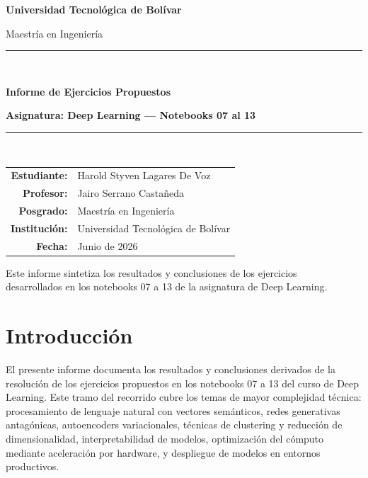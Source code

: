 \documentclass[12pt, a4paper]{article}
\begin{document}

\begin{titlepage}
  \centering
  \vspace*{1.5cm}
  {\Large\bfseries\color{azulutb} Universidad Tecnológica de Bolívar \par}
  \vspace{0.3cm}
  {\large Maestría en Ingeniería \par}
  \vspace{2cm}
  \rule{\linewidth}{1.2pt}\\[0.4cm]
  {\LARGE\bfseries Informe de Ejercicios Propuestos \par}
  {\large\bfseries Asignatura: Deep Learning --- Notebooks 07 al 13 \par}
  \rule{\linewidth}{1.2pt}\\[2cm]

  \begin{tabular}{rl}
    \textbf{Estudiante:} & Harold Styven Lagares De Voz \\[4pt]
    \textbf{Profesor:}   & Jairo Serrano Castañeda \\[4pt]
    \textbf{Posgrado:}   & Maestría en Ingeniería \\[4pt]
    \textbf{Institución:} & Universidad Tecnológica de Bolívar \\[4pt]
    \textbf{Fecha:}      & Junio de 2026 \\
  \end{tabular}

  \vfill
  {\small\textcolor{grisnota}{Este informe sintetiza los resultados y conclusiones de los ejercicios\\
  desarrollados en los notebooks 07 a 13 de la asignatura de Deep Learning.}}
\end{titlepage}

\tableofcontents
\newpage

\section{Introducción}

El presente informe documenta los resultados y conclusiones derivados de la resolución de los ejercicios propuestos en los notebooks 07 a 13 del curso de Deep Learning. Este tramo del recorrido cubre los temas de mayor complejidad técnica: procesamiento de lenguaje natural con vectores semánticos, redes generativas antagónicas, autoencoders variacionales, técnicas de clustering y reducción de dimensionalidad, interpretabilidad de modelos, optimización del cómputo mediante aceleración por hardware, y despliegue de modelos en entornos productivos.
\end{document}
